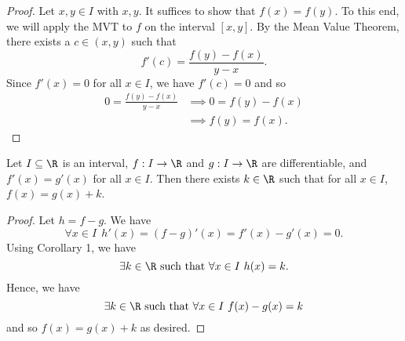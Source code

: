 \begin{proof}
    Let \( x,y \in I  \) with \( x , y  \). It suffices to show that \( f(x) = f(y) \). To this end, we will apply the MVT to \( f  \) on the interval \( [x,y] \). By the Mean Value Theorem, there exists a \( c \in (x,y) \) such that 
    \[  f'(c) = \frac{ f(y) - f(x)  }{  y - x  }. \]
    Since \( f'(x) = 0  \) for all \( x \in I  \), we have \( f'(c) = 0  \) and so
    \begin{align*}
        0 = \frac{ f(y) - f(x) }{  y - x  }  &\implies 0 = f(y) - f(x)   \\
                                             &\implies f(y) = f(x).
    \end{align*}
\end{proof}

\begin{corollary}
    Let \( I \subseteq  \R   \) is an interval, \( f: I \to \R  \) and \( g: I \to \R  \) are differentiable, and \( f'(x) = g'(x) \) for all \( x \in I  \). Then there exists \( k \in \R  \) such that for all \( x \in I  \), \( f(x) = g(x) + k  \).
\end{corollary}

\begin{proof}
Let \( h = f - g  \). We have 
\[  \forall x \in I \ \ h'(x) = (f - g )'(x) = f'(x) - g'(x) = 0.  \]
Using Corollary 1, we have  
\[  \exists k \in \R \ \text{such that} \ \forall x \in I \ h(x) = k.  \]
Hence, we have 
\[  \exists k \in \R \  \text{such that} \ \forall x \in I \ f(x) - g(x) = k  \]
and so \( f(x) = g(x) + k  \) as desired.
\end{proof}

